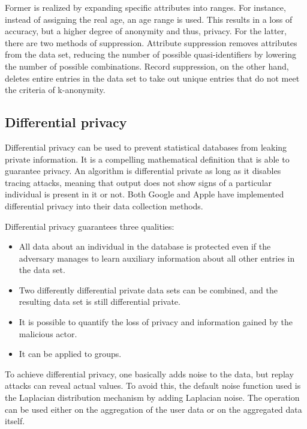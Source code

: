 Former is realized by expanding specific attributes into ranges. For instance, instead of assigning the real age, an age range is used. This results in a loss of accuracy, but a higher degree of anonymity and thus, privacy. For the latter, there are two methods of suppression. Attribute suppression removes attributes from the data set, reducing the number of possible quasi-identifiers by lowering the number of possible combinations. Record suppression, on the other hand, deletes entire entries in the data set to take out unique entries that do not meet the criteria of k-anonymity.

\subsection{Differential privacy}
Differential privacy can be used to prevent statistical databases from leaking private information. It is a compelling mathematical definition that is able to guarantee privacy. An algorithm is differential private as long as it disables tracing attacks, meaning that output does not show signs of a particular individual is present in it or not. Both Google and Apple have implemented differential privacy into their data collection methods.

Differential privacy guarantees three qualities:
\begin{itemize}
    \item All data about an individual in the database is protected even if the adversary manages to learn auxiliary information about all other entries in the data set.
    \item Two differently differential private data sets can be combined, and the resulting data set is still differential private.
    \item It is possible to quantify the loss of privacy and information gained by the malicious actor.
    \item It can be applied to groups.
\end{itemize}

To achieve differential privacy, one basically adds noise to the data, but replay attacks can reveal actual values. To avoid this, the default noise function used is the Laplacian distribution mechanism by adding Laplacian noise. The operation can be used either on the aggregation of the user data or on the aggregated data itself.

